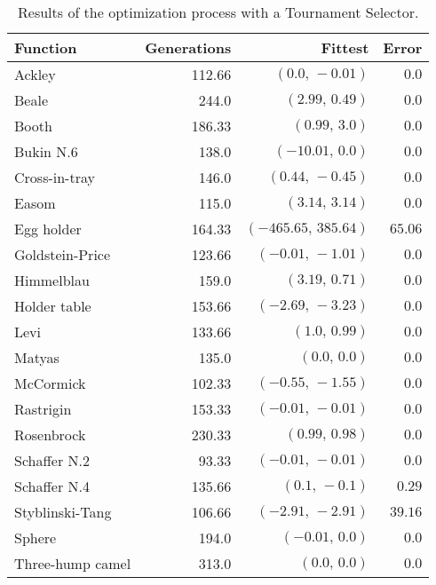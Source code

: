     \begin{table}[H]
      \centering
      \begin{tabular}{|l|r|r|r|}
        \hline
        Function  & Generations & Fittest 
          & Error \\
        \hline\hline
        Ackley	& 112.66	& \((0.0,\, -0.01)\)	& \(0.0\)\\\hline
        Beale	& 244.0	& \((2.99,\, 0.49)\)	& \(0.0\)\\\hline
        Booth	& 186.33	& \((0.99,\, 3.0)\)	& \(0.0\)\\\hline
        Bukin N.6	& 138.0	& \((-10.01,\, 0.0)\)	& \(0.0\)\\\hline
        Cross-in-tray	& 146.0	& \((0.44,\, -0.45)\)	& \(0.0\)\\\hline
        Easom	& 115.0	& \((3.14,\, 3.14)\)	& \(0.0\)\\\hline
        Egg holder	& 164.33	& \((-465.65,\, 385.64)\)	& \(65.06\)\\\hline
        Goldstein-Price	& 123.66	& \((-0.01,\, -1.01)\)	& \(0.0\)\\\hline
        Himmelblau	& 159.0	& \((3.19,\, 0.71)\)	& \(0.0\)\\\hline
        Holder table	& 153.66	& \((-2.69,\, -3.23)\)	& \(0.0\)\\\hline
        Levi	& 133.66	& \((1.0,\, 0.99)\)	& \(0.0\)\\\hline
        Matyas	& 135.0	& \((0.0,\, 0.0)\)	& \(0.0\)\\\hline
        McCormick	& 102.33	& \((-0.55,\, -1.55)\)	& \(0.0\)\\\hline
        Rastrigin	& 153.33	& \((-0.01,\, -0.01)\)	& \(0.0\)\\\hline
        Rosenbrock	& 230.33	& \((0.99,\, 0.98)\)	& \(0.0\)\\\hline
        Schaffer N.2	& 93.33	& \((-0.01,\, -0.01)\)	& \(0.0\)\\\hline
        Schaffer N.4	& 135.66	& \((0.1,\, -0.1)\)	& \(0.29\)\\\hline
        Styblinski-Tang	& 106.66	& \((-2.91,\, -2.91)\)	& \(39.16\)\\\hline
        Sphere	& 194.0	& \((-0.01,\, 0.0)\)	& \(0.0\)\\\hline
        Three-hump camel	& 313.0	& \((0.0,\, 0.0)\)	& \(0.0\)\\\hline
      \end{tabular}
      \caption{Results of the optimization process with a Tournament Selector.}
    \end{table}

